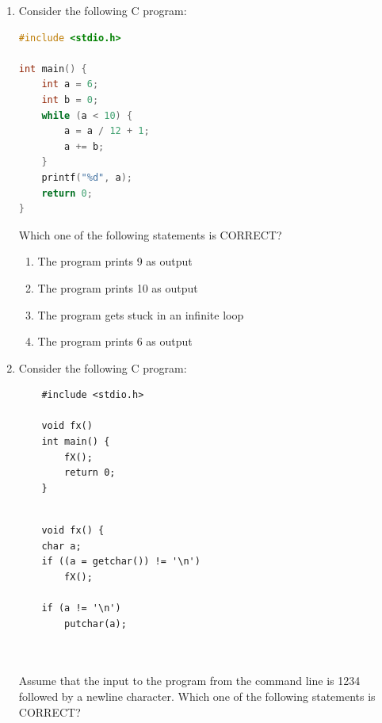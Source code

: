 \documentclass[a4paper, 11pt]{article}
\begin{document}
\begin{enumerate}
    \item Consider the following C program:
    \begin{lstlisting}[language=C]
#include <stdio.h>

int main() {
    int a = 6;
    int b = 0;
    while (a < 10) {
        a = a / 12 + 1;
        a += b;
    }
    printf("%d", a);
    return 0;
}
    \end{lstlisting}
    Which one of the following statements is CORRECT?

    \begin{enumerate}
        \item The program prints 9 as output
        \item The program prints 10 as output
        \item The program gets stuck in an infinite loop
        \item The program prints 6 as output
    \end{enumerate}
    \hfill{}

    \item Consider the following C program:\\
    \begin{minipage}{5cm}
    \begin{lstlisting}       
    #include <stdio.h>
    
    void fx()
    int main() {
        fX();
        return 0;
    }
    
    \end{lstlisting}
    \end{minipage}
    \begin{minipage}{5cm}
    \begin{lstlisting}   
    void fx() {
    char a;
    if ((a = getchar()) != '\n') 
        fX();
    
    if (a != '\n')
        putchar(a);
    
    \end{lstlisting}
    \end{minipage}\\
    Assume that the input to the program from the command line is 1234 followed by a newline character. Which one of the following statements is CORRECT? 
    \begin{enumerate}
    \end{enumerate}
    \hfill{}


\end{enumerate}
\end{document}
